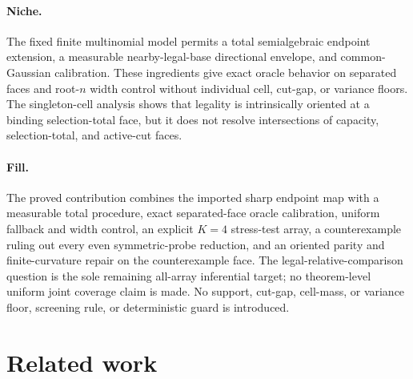 \documentclass{article}
\begin{document}
\paragraph{Niche.} The fixed finite multinomial model permits a total semialgebraic endpoint extension, a measurable nearby-legal-base directional envelope, and common-Gaussian calibration. These ingredients give exact oracle behavior on separated faces and root-\(n\) width control without individual cell, cut-gap, or variance floors. The singleton-cell analysis shows that legality is intrinsically oriented at a binding selection-total face, but it does not resolve intersections of capacity, selection-total, and active-cut faces.

\paragraph{Fill.} The proved contribution combines the imported sharp endpoint map with a measurable total procedure, exact separated-face oracle calibration, uniform fallback and width control, an explicit \(K=4\) stress-test array, a counterexample ruling out every even symmetric-probe reduction, and an oriented parity and finite-curvature repair on the counterexample face. The legal-relative-comparison question is the sole remaining all-array inferential target; no theorem-level uniform joint coverage claim is made. No support, cut-gap, cell-mass, or variance floor, screening rule, or deterministic guard is introduced.

\section{Related work}
\end{document}
